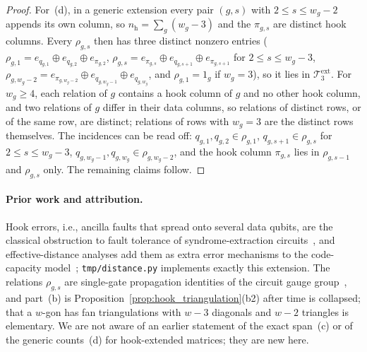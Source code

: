 \documentclass[12pt]{article}
\theoremstyle{definition}
\newcommand{\Tc}{\mathcal{T}_3}
\newcommand{\ttt}[1]{\texttt{#1}}
\begin{document}
\begin{proof}
For~(d), in a generic extension every pair $(g, s)$ with $2 \le s \le w_g - 2$ appends its own column, so
$n_{\mathrm{h}} = \sum_g (w_g - 3)$ and the $\pi_{g,s}$ are distinct hook columns. Every $\rho_{g,s}$ then has three
distinct nonzero entries ($\rho_{g,1} = e_{q_{g,1}} \oplus e_{q_{g,2}} \oplus e_{\pi_{g,2}}$, $\rho_{g,s} =
e_{\pi_{g,s}} \oplus e_{q_{g,s+1}} \oplus e_{\pi_{g,s+1}}$ for $2 \le s \le w_g - 3$, $\rho_{g,w_g-2} =
e_{\pi_{g,w_g-2}} \oplus e_{q_{g,w_g-1}} \oplus e_{q_{g,w_g}}$, and $\rho_{g,1} = 1_g$ if $w_g = 3$), so it lies in
$\Tc^{\mathrm{ext}}$. For $w_g \ge 4$, each relation of $g$ contains a hook column of $g$ and no other hook column,
and two relations of $g$ differ in their data columns, so relations of distinct rows, or of the same row, are
distinct; relations of rows with $w_g = 3$ are the distinct rows themselves. The incidences can be read off: $q_{g,1},
q_{g,2} \in \rho_{g,1}$, $q_{g,s+1} \in \rho_{g,s}$ for $2 \le s \le w_g - 3$, $q_{g,w_g-1}, q_{g,w_g} \in
\rho_{g,w_g-2}$, and the hook column $\pi_{g,s}$ lies in $\rho_{g,s-1}$ and $\rho_{g,s}$ only. The remaining claims
follow.
\end{proof}

\paragraph{Prior work and attribution.}
Hook errors, i.e., ancilla faults that spread onto several data qubits, are the classical obstruction to fault
tolerance of syndrome-extraction circuits~\cite{DennisKitaevLandahlPreskill2002,Fowler2012}, and effective-distance
analyses add them as extra error mechanisms to the code-capacity model~\cite{ManesClaes2025,
BravyiCrossGambettaMaslovRallYoder2024}; \ttt{tmp/distance.py} implements exactly this extension. The relations
$\rho_{g,s}$ are single-gate propagation identities of the circuit gauge group~\cite{BaconFlammiaHarrowShi2017,
Pryadko2020MLD}, and part~(b) is Proposition~\ref{prop:hook_triangulation}(b2) after time is collapsed; that a
$w$-gon has fan triangulations with $w - 3$ diagonals and $w - 2$ triangles is elementary. We are not aware of an
earlier statement of the exact span~(c) or of the generic counts~(d) for hook-extended matrices; they are new here.
\end{document}
